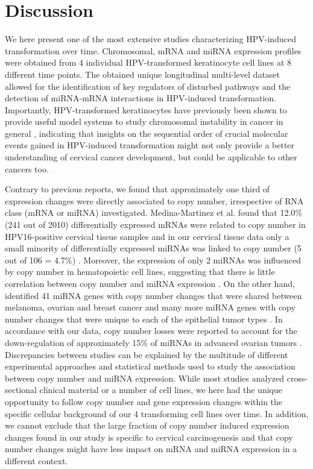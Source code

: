 \section{Discussion}

We here present one of the most extensive studies characterizing HPV-induced transformation over time. Chromosomal, mRNA and miRNA expression profiles were obtained from 4 individual HPV-transformed keratinocyte cell lines at 8 different time points. The obtained unique longitudinal multi-level dataset allowed for the identification of key regulators of disturbed pathways and the detection of miRNA-mRNA interactions in HPV-induced transformation. Importantly, HPV-transformed keratinocytes have previously been shown to provide useful model systems to study chromosomal instability in cancer in general \cite{Korzeniewski2011, Duensing2002}, indicating that insights on the sequential order of crucial molecular events gained in HPV-induced transformation might not only provide a better understanding of cervical cancer development, but could be applicable to other cancers too. 

Contrary to previous reports, we found that approximately one third of expression changes were directly associated to copy number, irrespective of RNA class (mRNA or miRNA) investigated. Medina-Martinez et al. found that 12.0$\%$ (241 out of 2010) differentially expressed mRNAs were related to copy number in HPV16-positive cervical tissue samples and in our cervical tissue data only a small minority of differentially expressed miRNAs was linked to copy number (5 out of 106 = 4.7$\%$) \cite{Wilting2013, Kanehisa2000, Miok2017, Livak2001, Wilting2016, Paoli2013, Frisch2013, Garofalo2012, Boon2015, Korzeniewski2011, Duensing2002, Medina2014}. Moreover, the expression of only 2 miRNAs was influenced by copy number in hematopoietic cell lines, suggesting that there is little correlation between copy number and miRNA expression \cite{Veigaard2014}. On the other hand, \cite{Zhang2006} identified 41 miRNA genes with copy number changes that were shared between melanoma, ovarian and breast cancer and many more miRNA genes with copy number changes that were unique to each of the epithelial tumor types \cite{Zhang2006}. In accordance with our data, copy number losses were reported to account for the down-regulation of approximately 15$\%$ of miRNAs in advanced ovarian tumors \cite{Zhang2008}. Discrepancies between studies can be explained by the multitude of different experimental approaches and statistical methods used to study the association between copy number and miRNA expression. While most studies analyzed cross-sectional clinical material or a number of cell lines, we here had the unique opportunity to follow copy number and gene expression changes within the specific cellular background of our 4 transforming cell lines over time. In addition, we cannot exclude that the large fraction of copy number induced expression changes found in our study is specific to cervical carcinogenesis and that copy number changes might have less impact on mRNA and miRNA expression in a different context.


